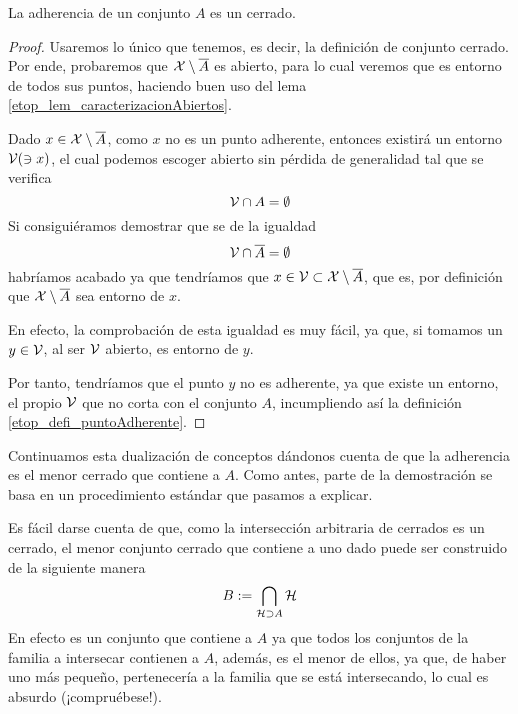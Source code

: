 \begin{lem}
	\label{etop_lem_clausuraAdherencia}
	La adherencia de un conjunto $A$ es un cerrado.
\end{lem}
\begin{proof}
	Usaremos lo único que tenemos, es decir, la definición de conjunto cerrado. Por ende, probaremos que $\mathcal{X}\setminus\overline{A}$ es abierto, para lo cual veremos que es entorno de todos sus puntos, haciendo buen uso del lema \ref{etop_lem_caracterizacionAbiertos}.
	
	Dado $x\in\mathcal{X}\setminus\overline{A}$, como $x$ no es un punto adherente, entonces existirá un entorno $\mathcal{V}(\ni x)$, el cual podemos escoger abierto sin pérdida de generalidad tal que se verifica
	\begin{equation*}
		\mathcal{V}\cap A=\emptyset
	\end{equation*}
	Si consiguiéramos demostrar que se de la igualdad
	\begin{equation*}
		\mathcal{V}\cap \overline{A}=\emptyset
	\end{equation*}
	habríamos acabado ya que tendríamos que $x\in\mathcal{V}\subset\mathcal{X}\setminus\overline{A}$, que es, por definición que $\mathcal{X}\setminus \overline{A}$ sea entorno de $x$.
	
	En efecto, la comprobación de esta igualdad es muy fácil, ya que, si tomamos un $y\in\mathcal{V}$, al ser $\mathcal{V}$ abierto, es entorno de $y$.
	
	Por tanto, tendríamos que el punto $y$ no es adherente, ya que existe un entorno, el propio $\mathcal{V}$ que no corta con el conjunto $A$, incumpliendo así la definición \ref{etop_defi_puntoAdherente}.
\end{proof}
Continuamos esta dualización de conceptos dándonos cuenta de que la adherencia es el menor cerrado que contiene a $A$. Como antes, parte de la demostración se basa en un procedimiento estándar que pasamos a explicar.

Es fácil darse cuenta de que, como la intersección arbitraria de cerrados es un cerrado, el menor conjunto cerrado que contiene a uno dado puede ser construido de la siguiente manera
\begin{equation}
\label{etop_eq_menorCerrado}
	B:=\bigcap_{\mathcal{H}\supset A}\mathcal{H}
\end{equation}
En efecto es un conjunto que contiene a $A$ ya que todos los conjuntos de la familia a intersecar contienen a $A$, además, es el menor de ellos, ya que, de haber uno más pequeño, pertenecería a la familia que se está intersecando, lo cual es absurdo (¡compruébese!).

